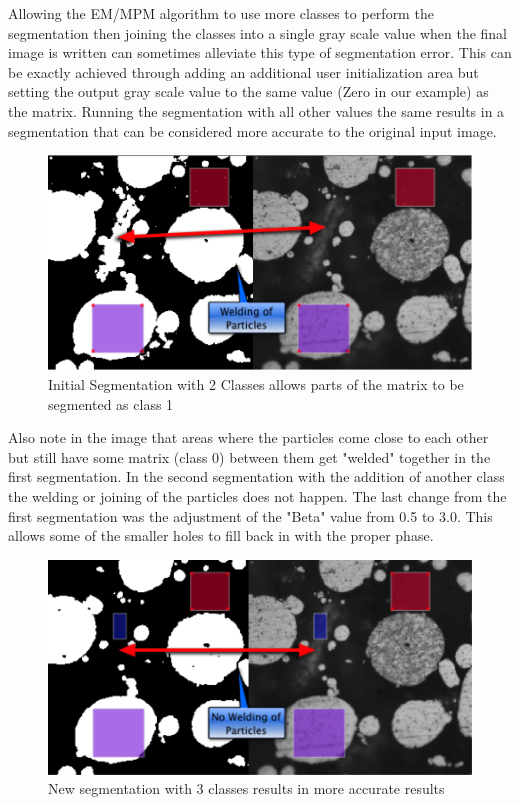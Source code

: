 \documentclass[12pt,oneside]{book}
\begin{document}
Allowing the EM/MPM algorithm to use more classes to perform the segmentation then joining the classes into a single gray scale value when the final image is written can sometimes alleviate this type of segmentation error. This can be exactly achieved through adding an additional user initialization area but setting the output gray scale value to the same value (Zero in our example) as the matrix. Running the segmentation with all other values the same results in a segmentation that can be considered more accurate to the original input image.
 
\begin{figure}[htbp]
\begin{center}
\includegraphics[width=6.25in]{images/Untitled11.png}
\caption{Initial Segmentation with 2 Classes allows parts of the matrix to be segmented as class 1}
\label{image11}
\end{center}
\end{figure}

Also note in the image that areas where the particles come close to each other but still have some matrix (class 0) between them get "welded" together in the first segmentation. In the second segmentation with the addition of another class the welding or joining of the particles does not happen. The last change from the first segmentation was the adjustment of the "Beta" value from 0.5 to 3.0. This allows some of the smaller holes to fill back in with the proper phase. 
 

\begin{figure}[htbp]
\begin{center}
\includegraphics[width=6.25in]{images/Untitled12.png}
\caption{New segmentation with 3 classes results in more accurate results}
\label{image12}
\end{center}
\end{figure}
\end{document}
